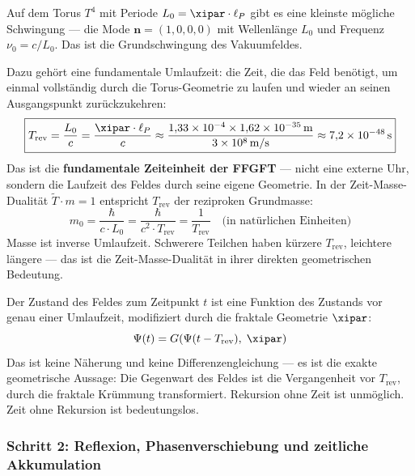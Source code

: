 Auf dem Torus $T^4$ mit Periode $L_0 = \xipar \cdot \ell_P$ gibt es eine
kleinste mögliche Schwingung — die Mode $\mathbf{n} = (1,0,0,0)$ mit
Wellenlänge $L_0$ und Frequenz $\nu_0 = c/L_0$. Das ist die Grundschwingung
des Vakuumfeldes.

Dazu gehört eine fundamentale Umlaufzeit: die Zeit, die das Feld benötigt,
um einmal vollständig durch die Torus-Geometrie zu laufen und wieder an seinen
Ausgangspunkt zurückzukehren:
\begin{equation}
    \boxed{T_\text{rev} = \frac{L_0}{c} = \frac{\xipar \cdot \ell_P}{c}
    \approx \frac{1{,}33 \times 10^{-4} \times 1{,}62 \times 10^{-35}\,\text{m}}{3 \times 10^8\,\text{m/s}}
    \approx 7{,}2 \times 10^{-48}\,\text{s}}
    \label{eq:Trev}
\end{equation}
Das ist die \textbf{fundamentale Zeiteinheit der FFGFT} — nicht eine externe Uhr,
sondern die Laufzeit des Feldes durch seine eigene Geometrie. In der
Zeit-Masse-Dualität $\tilde{T} \cdot m = 1$ entspricht $T_\text{rev}$ der
reziproken Grundmasse:
\begin{equation}
    m_0 = \frac{\hbar}{c \cdot L_0} = \frac{\hbar}{c^2 \cdot T_\text{rev}}
    = \frac{1}{T_\text{rev}} \quad \text{(in natürlichen Einheiten)}
\end{equation}
Masse ist inverse Umlaufzeit. Schwerere Teilchen haben kürzere $T_\text{rev}$,
leichtere längere — das ist die Zeit-Masse-Dualität in ihrer direkten geometrischen
Bedeutung.

\begin{foundation}
Der Zustand des Feldes zum Zeitpunkt $t$ ist eine Funktion des Zustands
vor genau einer Umlaufzeit, modifiziert durch die fraktale Geometrie $\xipar$:
\begin{equation}
    \Psi(t) = G\!\left(\Psi(t - T_\text{rev}),\; \xipar\right)
    \label{eq:recursion}
\end{equation}
Das ist keine Näherung und keine Differenzengleichung — es ist die exakte
geometrische Aussage: Die Gegenwart des Feldes ist die Vergangenheit vor
$T_\text{rev}$, durch die fraktale Krümmung transformiert. Rekursion ohne
Zeit ist unmöglich. Zeit ohne Rekursion ist bedeutungslos.
\end{foundation}

\subsubsection*{Schritt 2: Reflexion, Phasenverschiebung und zeitliche Akkumulation}

